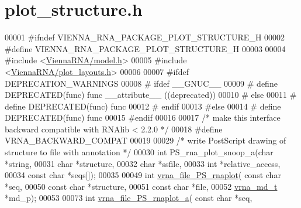 \hypertarget{plot__structure_8h_source}{}\section{plot\+\_\+structure.\+h}
\label{plot__structure_8h_source}

\begin{DoxyCode}
00001 \textcolor{preprocessor}{#ifndef VIENNA\_RNA\_PACKAGE\_PLOT\_STRUCTURE\_H}
00002 \textcolor{preprocessor}{#define VIENNA\_RNA\_PACKAGE\_PLOT\_STRUCTURE\_H}
00003 
00004 \textcolor{preprocessor}{#include <\hyperlink{model_8h}{ViennaRNA/model.h}>}
00005 \textcolor{preprocessor}{#include <\hyperlink{plot__layouts_8h}{ViennaRNA/plot\_layouts.h}>}
00006 
00007 \textcolor{preprocessor}{#ifdef DEPRECATION\_WARNINGS}
00008 \textcolor{preprocessor}{# ifdef \_\_GNUC\_\_}
00009 \textcolor{preprocessor}{#  define DEPRECATED(func) func \_\_attribute\_\_ ((deprecated))}
00010 \textcolor{preprocessor}{# else}
00011 \textcolor{preprocessor}{#  define DEPRECATED(func) func}
00012 \textcolor{preprocessor}{# endif}
00013 \textcolor{preprocessor}{#else}
00014 \textcolor{preprocessor}{# define DEPRECATED(func) func}
00015 \textcolor{preprocessor}{#endif}
00016 
00017 \textcolor{comment}{/* make this interface backward compatible with RNAlib < 2.2.0 */}
00018 \textcolor{preprocessor}{#define VRNA\_BACKWARD\_COMPAT}
00019 
00029 \textcolor{comment}{/* write PostScript drawing of structure to file with annotation */}
00030 \textcolor{keywordtype}{int} PS\_rna\_plot\_snoop\_a(\textcolor{keywordtype}{char} *\textcolor{keywordtype}{string},
00031                         \textcolor{keywordtype}{char} *structure,
00032                         \textcolor{keywordtype}{char} *ssfile,
00033                         \textcolor{keywordtype}{int} *relative\_access,
00034                         \textcolor{keyword}{const} \textcolor{keywordtype}{char} *seqs[]);
00035 
00049 \textcolor{keywordtype}{int} \hyperlink{group__plotting__utils_gabdc8f6548ba4a3bc3cd868ccbcfdb86a}{vrna\_file\_PS\_rnaplot}( \textcolor{keyword}{const} \textcolor{keywordtype}{char} *seq,
00050                           \textcolor{keyword}{const} \textcolor{keywordtype}{char} *structure,
00051                           \textcolor{keyword}{const} \textcolor{keywordtype}{char} *file,
00052                           \hyperlink{group__model__details_structvrna__md__s}{vrna\_md\_t}  *md\_p);
00053 
00073 \textcolor{keywordtype}{int} \hyperlink{group__plotting__utils_ga139a31dd0ba9fc6612431f67de901c31}{vrna\_file\_PS\_rnaplot\_a}( \textcolor{keyword}{const} \textcolor{keywordtype}{char} *seq,

\end{DoxyCode}
